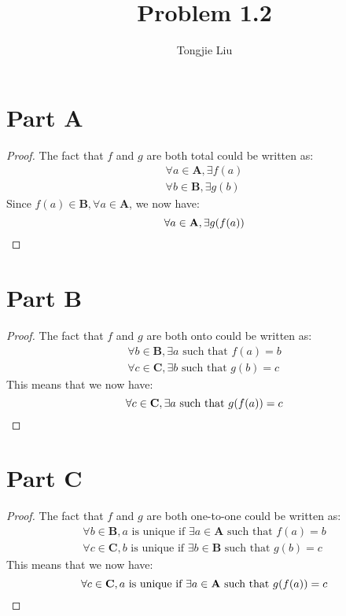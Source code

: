 \documentclass{article}
\title{Problem 1.2}
\author{Tongjie Liu}
\begin{document}
\maketitle


\section{Part A}
\begin{proof}
	The fact that $f$ and $g$ are both total could be written as:
	\begin{align*}
		\forall a \in \mathbf{A}, \exists f(a) \\
		\forall b \in \mathbf{B}, \exists g(b)
	\end{align*}
	Since $f(a) \in \mathbf{B}, \forall a \in \mathbf{A}$, we now have:
	\begin{equation*}
		\forall a \in \mathbf{A}, \exists g(f(a)) \qedhere
	\end{equation*}
\end{proof}


\section{Part B}
\begin{proof}
	The fact that $f$ and $g$ are both onto could be written as:
	\begin{align*}
		\forall b \in \mathbf{B}, \exists a \text{ such that }
		f(a) = b \\
		\forall c \in \mathbf{C}, \exists b \text{ such that }
		g(b) = c
	\end{align*}
	This means that we now have:
	\begin{equation*}
		\forall c \in \mathbf{C}, \exists a \text{ such that }
		g(f(a)) = c \qedhere
	\end{equation*}
\end{proof}


\section{Part C}
\begin{proof}
	The fact that $f$ and $g$ are both one-to-one could be written as:
	\begin{align*}
		\forall b \in \mathbf{B}, a \text{ is unique if } \exists
		a \in \mathbf{A} \text{ such that } f(a) = b \\
		\forall c \in \mathbf{C}, b \text{ is unique if } \exists
		b \in \mathbf{B} \text{ such that } g(b) = c
	\end{align*}
	This means that we now have:
	\begin{equation*}
		\forall c \in \mathbf{C}, a \text{ is unique if } \exists
		a \in \mathbf{A} \text{ such that } g(f(a)) = c \qedhere
	\end{equation*}
\end{proof}
\end{document}
